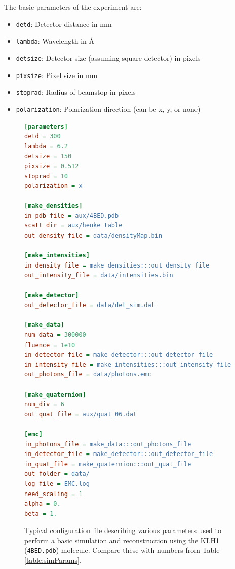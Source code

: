 \documentclass[]{iucr}              %
\begin{document}
The basic parameters of the experiment are:
\begin{itemize}
\item \texttt{detd}: Detector distance in mm
\item \texttt{lambda}: Wavelength in \AA
\item \texttt{detsize}: Detector size (assuming square detector) in pixels
\item \texttt{pixsize}: Pixel size in mm
\item \texttt{stoprad}: Radius of beamstop in pixels
\item \texttt{polarization}: Polarization direction (can be x, y, or none)
\end{itemize}

\begin{figure}
\begin{lstlisting}[language=ini]
[parameters]
detd = 300
lambda = 6.2
detsize = 150
pixsize = 0.512
stoprad = 10
polarization = x

[make_densities]
in_pdb_file = aux/4BED.pdb
scatt_dir = aux/henke_table
out_density_file = data/densityMap.bin

[make_intensities]
in_density_file = make_densities:::out_density_file
out_intensity_file = data/intensities.bin

[make_detector]
out_detector_file = data/det_sim.dat

[make_data]
num_data = 300000
fluence = 1e10
in_detector_file = make_detector:::out_detector_file
in_intensity_file = make_intensities:::out_intensity_file
out_photons_file = data/photons.emc

[make_quaternion]
num_div = 6
out_quat_file = aux/quat_06.dat

[emc]
in_photons_file = make_data:::out_photons_file
in_detector_file = make_detector:::out_detector_file
in_quat_file = make_quaternion:::out_quat_file
out_folder = data/
log_file = EMC.log
need_scaling = 1
alpha = 0.
beta = 1.
\end{lstlisting}
\caption{Typical configuration file describing various parameters used to perform a basic simulation and reconstruction using the KLH1 (\texttt{4BED.pdb}) molecule. Compare these with numbers from Table \ref{table:simParams}.}
\label{fig:config}
\end{figure}
\end{document}
